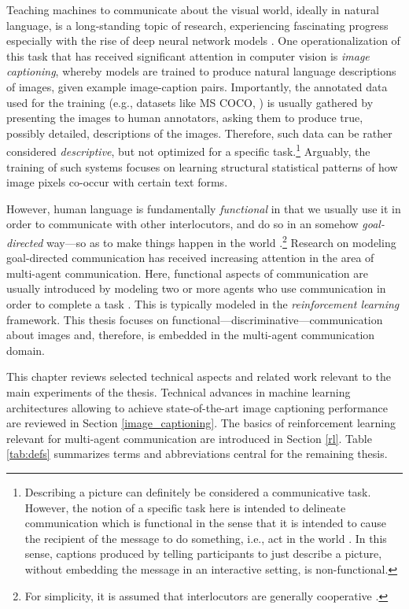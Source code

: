 Teaching machines to communicate about the visual world, ideally in natural language, is a long-standing topic of research, experiencing fascinating progress especially with the rise of deep neural network models \parencite{lecun2015deep, lake2017building}. 
One operationalization of this task that has received significant attention in computer vision is \textit{image captioning}, whereby models are trained to produce natural language descriptions of images, given example image-caption pairs. Importantly, the annotated data used for the training (e.g., datasets like MS COCO, \cite{chen2015microsoft}) is usually gathered by presenting the images to human annotators, asking them to produce true, possibly detailed, descriptions of the images. Therefore, such data can be rather considered \textit{descriptive}, but not optimized for a specific task.\footnote{Describing a picture can definitely be considered a communicative task. However, the notion of a specific task here is intended to delineate communication which is functional in the sense that it is intended to cause the recipient of the message to do something, i.e., act in the world \parencite{clark1996using, wittgenstein2010philosophical}. In this sense, captions produced by telling participants to just describe a picture, without embedding the message in an interactive setting, is non-functional.} Arguably, the training of such systems focuses on learning structural statistical patterns of how image pixels co-occur with certain text forms.

However, human language is fundamentally \textit{functional} in that we usually use it in order to communicate with other interlocutors, and do so in an somehow \textit{goal-directed} way---so as to make things happen in the world \parencite[e.g., ][]{wittgenstein2010philosophical, clark1996using}.\footnote{For simplicity, it is assumed that interlocutors are generally cooperative \parencite{grice1975logic}.} 
Research on modeling goal-directed communication has received increasing attention in the area of multi-agent communication. Here, functional aspects of communication are usually introduced by modeling two or more agents who use communication in order to complete a task \parencite{lazaridou2020multi}. This is typically modeled in the \textit{reinforcement learning} framework. This thesis focuses on functional---discriminative---communication about images and, therefore, is embedded in the multi-agent communication domain. 

This chapter reviews selected technical aspects and related work relevant to the main experiments of the thesis. Technical advances in machine learning architectures allowing to achieve state-of-the-art image captioning performance are reviewed in Section \ref{image_captioning}. The basics of reinforcement learning relevant for multi-agent communication are introduced in Section \ref{rl}. Table \ref{tab:defs} summarizes terms and abbreviations central for the remaining thesis. 


